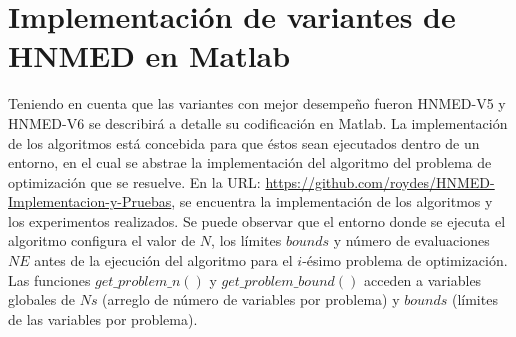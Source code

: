 
\chapter{Implementación de variantes de HNMED en Matlab} %

\label{AppendixA} %


Teniendo en cuenta que las variantes con mejor desempeño fueron HNMED-V5 y HNMED-V6 se describirá a detalle su codificación en Matlab. La implementación de los algoritmos está concebida para que éstos sean ejecutados dentro de un entorno, en el cual se abstrae la implementación del algoritmo del problema de optimización que se resuelve. En la URL:  \url{https://github.com/roydes/HNMED-Implementacion-y-Pruebas}, se encuentra la implementación de los algoritmos y los experimentos realizados. Se puede observar que el entorno donde se ejecuta el algoritmo configura el valor de $N$, los límites $bounds$ y número de evaluaciones $NE$ antes de la ejecución del algoritmo para el $i$-ésimo problema de optimización. Las funciones $get\_problem\_n()$ y $get\_problem\_bound()$ acceden a variables globales  de $Ns$ (arreglo de número de variables por problema) y $bounds$ (límites de las variables por problema).

